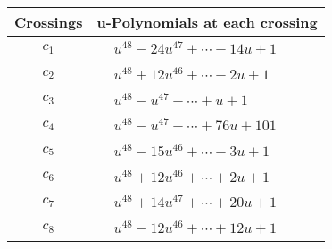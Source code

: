 \documentclass[1p]{elsarticle_modified}
\theoremstyle{definition}
\begin{document}
\begin{tabular}{m{50pt}|m{274pt}}
Crossings & \hspace{64pt}u-Polynomials at each crossing \\
\hline $$\begin{aligned}c_{1}\end{aligned}$$&$\begin{aligned}
&u^{48}-24 u^{47}+\cdots-14 u+1
\end{aligned}$\\
\hline $$\begin{aligned}c_{2}\end{aligned}$$&$\begin{aligned}
&u^{48}+12 u^{46}+\cdots-2 u+1
\end{aligned}$\\
\hline $$\begin{aligned}c_{3}\end{aligned}$$&$\begin{aligned}
&u^{48}- u^{47}+\cdots+u+1
\end{aligned}$\\
\hline $$\begin{aligned}c_{4}\end{aligned}$$&$\begin{aligned}
&u^{48}- u^{47}+\cdots+76 u+101
\end{aligned}$\\
\hline $$\begin{aligned}c_{5}\end{aligned}$$&$\begin{aligned}
&u^{48}-15 u^{46}+\cdots-3 u+1
\end{aligned}$\\
\hline $$\begin{aligned}c_{6}\end{aligned}$$&$\begin{aligned}
&u^{48}+12 u^{46}+\cdots+2 u+1
\end{aligned}$\\
\hline $$\begin{aligned}c_{7}\end{aligned}$$&$\begin{aligned}
&u^{48}+14 u^{47}+\cdots+20 u+1
\end{aligned}$\\
\hline $$\begin{aligned}c_{8}\end{aligned}$$&$\begin{aligned}
&u^{48}-12 u^{46}+\cdots+12 u+1
\end{aligned}$\\

\end{tabular}
\end{document}
